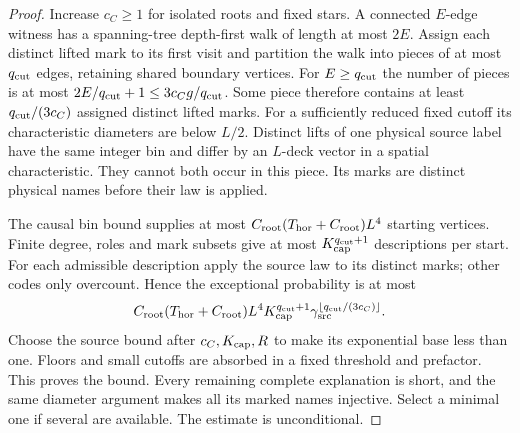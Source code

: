 \begin{proof}
Increase \(c_C\ge1\) for isolated roots and fixed stars. A connected
\(E\)-edge witness has a spanning-tree depth-first walk of length at
most \(2E\). Assign each distinct lifted mark to its first visit and
partition the walk into pieces of at most \(q_{\rm cut}\) edges,
retaining shared boundary vertices. For \(E\ge q_{\rm cut}\) the
number of pieces is at most \(2E/q_{\rm cut}+1\le3c_Cg/q_{\rm cut}\).
Some piece therefore contains at least \(q_{\rm cut}/(3c_C)\)
assigned distinct lifted marks. For a sufficiently reduced fixed cutoff
its characteristic diameters are below \(L/2\). Distinct lifts of
one physical source label have the same integer bin and differ by an \(L\)-deck
vector in a spatial characteristic. They cannot both occur in this
piece. Its marks are distinct physical names before their law is applied.

The causal bin bound supplies at most \(C_{\rm root}(T_{\rm hor}+C_{\rm root})L^4\) starting vertices.
Finite degree, roles and mark subsets give at most
\(K_{\rm cap}^{q_{\rm cut}+1}\) descriptions per start. For each
admissible description apply the source law to its distinct
marks; other codes only overcount. Hence the exceptional probability
is at most
\[
 C_{\rm root}(T_{\rm hor}+C_{\rm root})L^4 K_{\rm cap}^{q_{\rm cut}+1}
             \gamma_{\rm src}^{\lfloor q_{\rm cut}/(3c_C)\rfloor}.
\]
Choose the source bound after \(c_C,K_{\rm cap},R\) to make its
exponential base less than one. Floors and small cutoffs are absorbed
in a fixed threshold and prefactor. This proves the bound. Every
remaining complete explanation is short, and the same diameter
argument makes all its marked names injective. Select a minimal one
if several are available. The estimate is unconditional.
\end{proof}

